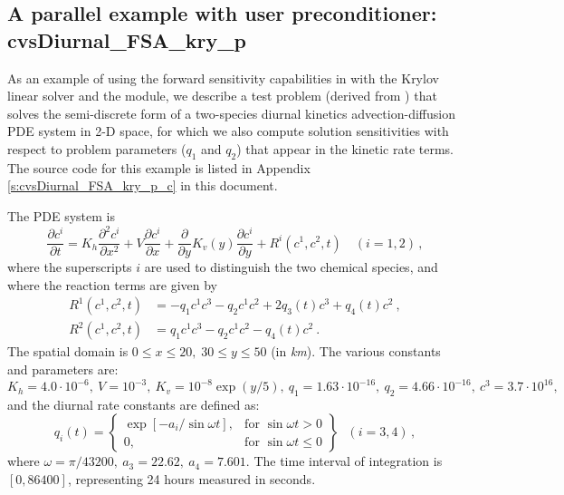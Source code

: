 


\subsection{A parallel example with user preconditioner: cvsDiurnal\_FSA\_kry\_p}
\label{ss:cvsDiurnal_FSA_kry_p}

As an example of using the forward sensitivity capabilities in {\cvodes} 
with the Krylov linear solver {\cvspgmr} and the {\nvecp} module, we describe
a test problem (derived from ) that solves the
semi-discrete form of a two-species diurnal kinetics advection-diffusion PDE 
system in 2-D space, for which we also compute solution sensitivities with respect to 
problem parameters ($q_1$ and $q_2$) that appear in the kinetic rate terms.
The source code for this example is listed in Appendix \ref{s:cvsDiurnal_FSA_kry_p_c}
in this document.

The PDE system is
\begin{equation}\label{e:cvsDiurnal_FSA_kry_p_PDE}
  \frac{\partial c^i}{\partial t} = K_h\frac{\partial^2 c^i}{\partial x^2}
  +V \frac{\partial c^i}{\partial x}
  + \frac{\partial} {\partial y} K_v(y) \frac{\partial c^i}{\partial y}
  + R^i(c^1,c^2,t) \quad (i=1,2) \, ,
\end{equation}
where the superscripts $i$ are used to distinguish the two chemical
species, and where the reaction terms are given by
\begin{equation}\label{e:cvsDiurnal_FSA_kry_p_R}
  \begin{split}
    R^1(c^1,c^2,t) & = -q_1c^1c^3-q_2c^1c^2+2q_3(t)c^3+q_4(t)c^2 ~, \\
    R^2(c^1,c^2,t) & = q_1c^1c^3-q_2c^1c^2-q_4(t)c^2 ~.
  \end{split}
\end{equation}
The spatial domain is $0 \leq x \leq 20,\;30 \leq y \leq 50$ (in {\em km}). 
The various constants and parameters are: $K_h=4.0\cdot 10^{-6},
~ V=10^{-3},~ K_v=10^{-8}\exp (y/5),~ q_1=1.63\cdot 10^{-16},
~ q_2=4.66\cdot 10^{-16},~ c^3=3.7\cdot 10^{16},$ and the diurnal
rate constants are defined as:
\begin{equation*}
  q_i(t) = 
  \left\{ \begin{array}{ll}
      \exp [-a_i/\sin \omega t], & \mbox{for } \sin \omega t>0 \\
      0, & \mbox{for } \sin \omega t\leq 0
    \end{array} \right\} ~~~(i=3,4) \, ,
\end{equation*}
where $\omega =\pi /43200, ~ a_3=22.62,~ a_4=7.601.$  The time interval of
integration is $[0, 86400]$, representing 24 hours measured in seconds.

